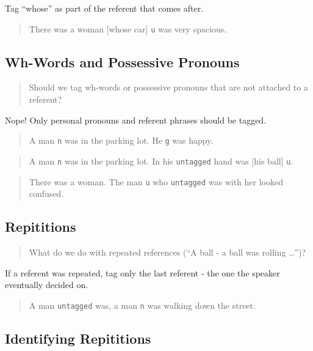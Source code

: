 \documentclass[
]{book}
\begin{document}
Tag ``whose'' as part of the referent that comes after.

\begin{quote}
There was a woman {[}whose car{]} \texttt{u} was very spacious.
\end{quote}

\hypertarget{wh-words-and-possessive-pronouns}{%
\subsection{Wh-Words and Possessive Pronouns}\label{wh-words-and-possessive-pronouns}}

\begin{quote}
Should we tag wh-words or possessive pronouns that are not attached to a referent?
\end{quote}

Nope! Only personal pronouns and referent phrases should be tagged.

\begin{quote}
A man \texttt{n} was in the parking lot.
He \texttt{g} was happy.
\end{quote}

\begin{quote}
A man \texttt{n} was in the parking lot.
In his \texttt{untagged} hand was {[}his ball{]} \texttt{u}.
\end{quote}

\begin{quote}
There was a woman.
The man \texttt{u} who \texttt{untagged} was with her looked confused.
\end{quote}

\hypertarget{repititions}{%
\subsection{Repititions}\label{repititions}}

\begin{quote}
What do we do with repeated references (``A ball - a ball was rolling \ldots{}'')?
\end{quote}

If a referent was repeated, tag only the last referent - the one the speaker eventually decided on.

\begin{quote}
A man \texttt{untagged} was, a man \texttt{n} was walking down the street.
\end{quote}

\hypertarget{identifying-repititions}{%
\subsection{Identifying Repititions}\label{identifying-repititions}}
\end{document}
